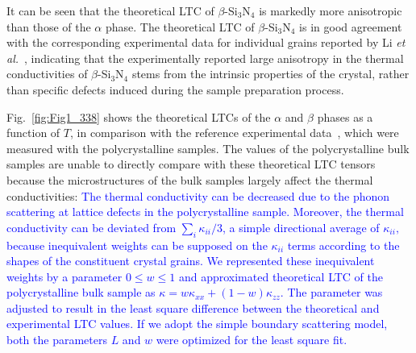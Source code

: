 \documentclass[twocolumn,amsmath,amssymb,a4paper,prb,superscriptaddress,floatfix]{revtex4-1}
\begin{document}
It can be seen that the theoretical LTC of $\beta$-Si$_3$N$_4$ is markedly
more anisotropic than those of the $\alpha$ phase. The theoretical LTC of
$\beta$-Si$_3$N$_4$ is in good agreement with the corresponding experimental
data for individual grains reported by Li {\it et al.}~\cite{li}, indicating
that the experimentally reported large anisotropy in the thermal conductivities
of $\beta$-Si$_3$N$_4$ stems from the intrinsic properties of the crystal,
rather than specific defects induced during the sample preparation process.

Fig.~\ref{fig:Fig1_338} shows the theoretical LTCs of the $\alpha$  and $\beta$
phases as a function of $T$, in comparison with the reference experimental
data~\cite{hirosaki,hirai,li}, which were measured with the polycrystalline
samples. The values of the polycrystalline bulk samples are unable to directly
compare with these theoretical LTC tensors because the microstructures of the
bulk samples largely affect the thermal conductivities:  \textcolor {blue} {The
thermal conductivity can be decreased due to the phonon scattering at
lattice defects in the polycrystalline sample. Moreover, the thermal
conductivity can be deviated from $\sum_i \kappa_{ii}/3$, a simple
directional average of $\kappa_{ii},$ because inequivalent weights can be
supposed on the $\kappa_{ii}$ terms  according to the shapes of the
constituent crystal grains.  We represented these inequivalent weights by a
parameter $0\le{w}\le{1}$ and approximated theoretical LTC of the polycrystalline bulk
sample as $\kappa = w\kappa_{xx} + (1-w) \kappa_{zz}$. The parameter 
was adjusted to result in the least square difference
between the theoretical and experimental LTC values. If we adopt the simple
boundary scattering model, both the parameters $L$ and $w$ were optimized
for the least square fit.}
\end{document}

